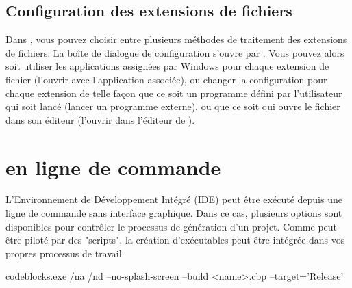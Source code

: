 \subsection{Configuration des extensions de fichiers}\label{sec:file_extension}

Dans \codeblocks, vous pouvez choisir entre plusieurs méthodes de traitement des extensions de fichiers. La boîte de dialogue de configuration s'ouvre par .
Vous pouvez alors soit utiliser les applications assignées par Windows pour chaque extension de fichier (l'ouvrir avec l'application associée), ou changer la configuration pour chaque extension de telle façon que ce soit un programme défini par l'utilisateur qui soit lancé (lancer un programme externe), ou que ce soit \codeblocks qui ouvre le fichier dans son éditeur (l'ouvrir dans l'éditeur de \codeblocks).


\section{\codeblocks en ligne de commande}

L'Environnement de Développement Intégré (IDE) \codeblocks peut être exécuté depuis une ligne de commande sans interface graphique. Dans ce cas, plusieurs options sont disponibles pour contrôler le processus de génération d'un projet. Comme \codeblocks peut être piloté par des "scripts", la création d'exécutables peut être intégrée dans vos propres processus de travail.

\begin{cmd}
codeblocks.exe /na /nd --no-splash-screen --build <name>.cbp --target='Release'
\end{cmd}

